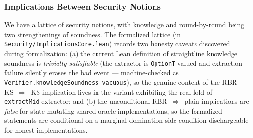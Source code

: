 



\subsubsection{Implications Between Security Notions}

We have a lattice of security notions, with knowledge and round-by-round being two strengthenings
of soundness.  The formalized lattice (in \texttt{Security/ImplicationsCore.lean}) records two
honesty caveats discovered during formalization: (a) the current Lean definition of straightline
knowledge soundness is \emph{trivially satisfiable} (the extractor is \texttt{OptionT}-valued and
extraction failure silently erases the bad event --- machine-checked as
\texttt{Verifier.knowledgeSoundness\_vacuous}), so the genuine content of the
RBR-KS~$\Rightarrow$~KS implication lives in the variant exhibiting the real fold-of-%
\texttt{extractMid} extractor; and (b) the unconditional RBR~$\Rightarrow$~plain implications are
\emph{false} for state-mutating shared-oracle implementations, so the formalized statements are
conditional on a marginal-domination side condition dischargeable for honest implementations.

